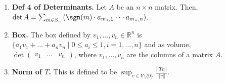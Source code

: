 \begin{enumerate}
	\item \textbf{Def 4 of Determinants. } Let $A$ be an $n \times n$ matrix. Then, $\det A = \sum_{m \in S_n} \left(\sgn(m) \cdot a_{m_1,1} \cdot \cdot \cdot a_{m_n,n}\right)$. 
	\item \textbf{Box. } The box defined by $v_1,\dots,v_n \in \mathbb{R}^n$ is $\{a_1v_1 + \dots + a_nv_n \mid 0 \leq a_i \leq 1, i =1,\dots,n\}$ and as volume, $\det \begin{pmatrix} v_1 & \dots & v_n \end{pmatrix}$, where $v_1,\dots,v_n$ are the columns of a matrix $A$. 
	\item \textbf{Norm of $T$. } This is defined to be $\sup_{v \in V \setminus \{0\}} \frac{||Tv||}{||v||}$. 
\end{enumerate}


